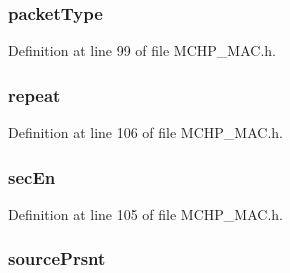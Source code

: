 \subsubsection[{packet\+Type}]{ packet\+Type}\label{struct_m_a_c___t_r_a_n_s___p_a_r_a_m_ae9ba6cc7db0327ea0474edba2cbde11e}


Definition at line 99 of file M\+C\+H\+P\+\_\+\+M\+A\+C.\+h.

\hypertarget{struct_m_a_c___t_r_a_n_s___p_a_r_a_m_ad174427cb4cda416943d7f2887bd8429}{}
\subsubsection[{repeat}]{ repeat}\label{struct_m_a_c___t_r_a_n_s___p_a_r_a_m_ad174427cb4cda416943d7f2887bd8429}


Definition at line 106 of file M\+C\+H\+P\+\_\+\+M\+A\+C.\+h.

\hypertarget{struct_m_a_c___t_r_a_n_s___p_a_r_a_m_a85e5fc5440ec2c1e9b7aaa3353b2de88}{}
\subsubsection[{sec\+En}]{ sec\+En}\label{struct_m_a_c___t_r_a_n_s___p_a_r_a_m_a85e5fc5440ec2c1e9b7aaa3353b2de88}


Definition at line 105 of file M\+C\+H\+P\+\_\+\+M\+A\+C.\+h.

\hypertarget{struct_m_a_c___t_r_a_n_s___p_a_r_a_m_a27dd21605fc04451aca0615da8b21582}{}
\subsubsection[{source\+Prsnt}]{ source\+Prsnt}\label{struct_m_a_c___t_r_a_n_s___p_a_r_a_m_a27dd21605fc04451aca0615da8b21582}



